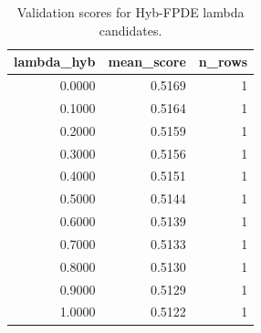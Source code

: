 \begin{table}[t]
\caption{Validation scores for Hyb-FPDE lambda candidates.}
\label{tab:lambda_distribution_computed}
\centering
\begin{tabular}{rrr}
\toprule
lambda\_hyb & mean\_score & n\_rows \\
\midrule
0.0000 & 0.5169 & 1 \\
0.1000 & 0.5164 & 1 \\
0.2000 & 0.5159 & 1 \\
0.3000 & 0.5156 & 1 \\
0.4000 & 0.5151 & 1 \\
0.5000 & 0.5144 & 1 \\
0.6000 & 0.5139 & 1 \\
0.7000 & 0.5133 & 1 \\
0.8000 & 0.5130 & 1 \\
0.9000 & 0.5129 & 1 \\
1.0000 & 0.5122 & 1 \\
\bottomrule
\end{tabular}

\end{table}
